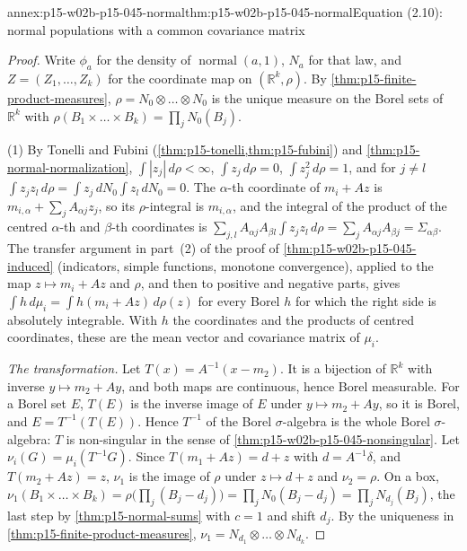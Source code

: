 \begin{annexitem}{annex:p15-w02b-p15-045-normal}{thm:p15-w02b-p15-045-normal}{Equation (2.10): normal populations with a common covariance matrix}
\begin{proof}
Write \(\phi_{a}\) for the density of \(\operatorname{normal}(a,1)\),
\(N_a\) for that law, and \(Z=(Z_1,\dots,Z_k)\) for the coordinate map
on \((\mathbb R^k,\rho)\). By \cref{thm:p15-finite-product-measures},
\(\rho=N_0\otimes\dots\otimes N_0\) is the unique measure on the Borel
sets of \(\mathbb R^k\) with
\(\rho(B_1\times\dots\times B_k)=\prod_jN_0(B_j)\).

(1) By Tonelli and Fubini (\cref{thm:p15-tonelli,thm:p15-fubini}) and
\cref{thm:p15-normal-normalization}, \(\int|z_j|\,d\rho<\infty\),
\(\int z_j\,d\rho=0\), \(\int z_j^2\,d\rho=1\), and for \(j\neq l\)
\(\int z_jz_l\,d\rho=\int z_j\,dN_0\int z_l\,dN_0=0\). The
\(\alpha\)-th coordinate of \(m_i+Az\) is
\(m_{i,\alpha}+\sum_jA_{\alpha j}z_j\), so its \(\rho\)-integral is
\(m_{i,\alpha}\), and the integral of the product of the centred
\(\alpha\)-th and \(\beta\)-th coordinates is
\(\sum_{j,l}A_{\alpha j}A_{\beta l}\int z_jz_l\,d\rho=\sum_jA_{\alpha j}A_{\beta j}=\Sigma_{\alpha\beta}\).
The transfer argument in part~(2) of the proof of
\cref{thm:p15-w02b-p15-045-induced} (indicators, simple functions,
monotone convergence), applied to the map \(z\mapsto m_i+Az\) and
\(\rho\), and then to positive and negative parts, gives
\(\int h\,d\mu_i=\int h(m_i+Az)\,d\rho(z)\) for every Borel \(h\) for
which the right side is absolutely integrable. With \(h\) the
coordinates and the products of centred coordinates, these are the mean
vector and covariance matrix of \(\mu_i\).

\emph{The transformation.} Let \(T(x)=A^{-1}(x-m_2)\). It is a
bijection of \(\mathbb R^k\) with inverse \(y\mapsto m_2+Ay\), and both
maps are continuous, hence Borel measurable. For a Borel set \(E\),
\(T(E)\) is the inverse image of \(E\) under \(y\mapsto m_2+Ay\), so it
is Borel, and \(E=T^{-1}(T(E))\). Hence \(T^{-1}\) of the Borel
\(\sigma\)-algebra is the whole Borel \(\sigma\)-algebra: \(T\) is
non-singular in the sense of \cref{thm:p15-w02b-p15-045-nonsingular}.
Let \(\nu_i(G)=\mu_i(T^{-1}G)\). Since \(T(m_1+Az)=d+z\) with
\(d=A^{-1}\delta\), and \(T(m_2+Az)=z\), \(\nu_1\) is the image of
\(\rho\) under \(z\mapsto d+z\) and \(\nu_2=\rho\). On a box,
\(\nu_1(B_1\times\dots\times B_k)=\rho\bigl(\prod_j(B_j-d_j)\bigr)=\prod_jN_0(B_j-d_j)=\prod_jN_{d_j}(B_j)\),
the last step by \cref{thm:p15-normal-sums} with \(c=1\) and shift
\(d_j\). By the uniqueness in \cref{thm:p15-finite-product-measures},
\(\nu_1=N_{d_1}\otimes\dots\otimes N_{d_k}\).


\end{proof}
\end{annexitem}
